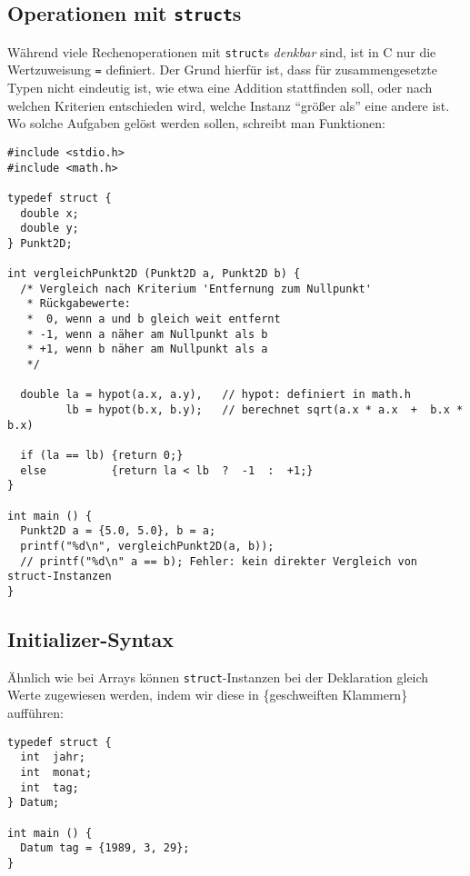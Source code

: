 \subsection{Operationen mit \texttt{struct}s}
Während viele Rechenoperationen mit \texttt{struct}s \emph{denkbar} sind, ist in C nur die Wertzuweisung \texttt{=} definiert. Der Grund hierfür ist, dass für zusammengesetzte Typen nicht eindeutig ist, wie etwa eine Addition stattfinden soll, oder nach welchen Kriterien entschieden wird, welche Instanz \enquote{größer als} eine andere ist. Wo solche Aufgaben gelöst werden sollen, schreibt man Funktionen:

\begin{codebox}
\begin{verbatim}
#include <stdio.h>
#include <math.h>

typedef struct {
  double x;
  double y;
} Punkt2D;

int vergleichPunkt2D (Punkt2D a, Punkt2D b) {
  /* Vergleich nach Kriterium 'Entfernung zum Nullpunkt' 
   * Rückgabewerte:
   *  0, wenn a und b gleich weit entfernt
   * -1, wenn a näher am Nullpunkt als b
   * +1, wenn b näher am Nullpunkt als a
   */
  
  double la = hypot(a.x, a.y),   // hypot: definiert in math.h
         lb = hypot(b.x, b.y);   // berechnet sqrt(a.x * a.x  +  b.x * b.x)
  
  if (la == lb) {return 0;}
  else          {return la < lb  ?  -1  :  +1;}
}

int main () {
  Punkt2D a = {5.0, 5.0}, b = a;
  printf("%d\n", vergleichPunkt2D(a, b));
  // printf("%d\n" a == b); Fehler: kein direkter Vergleich von struct-Instanzen
}
\end{verbatim}
\end{codebox}

\subsection{Initializer-Syntax} \label{sec:structInit}
Ähnlich wie bei Arrays können \texttt{struct}-Instanzen bei der Deklaration gleich Werte zugewiesen werden, indem wir diese in \{geschweiften Klammern\} aufführen:

\begin{codebox}
\begin{verbatim}
typedef struct {
  int  jahr;
  int  monat;
  int  tag;
} Datum;

int main () {
  Datum tag = {1989, 3, 29};
}
\end{verbatim}
\end{codebox}

